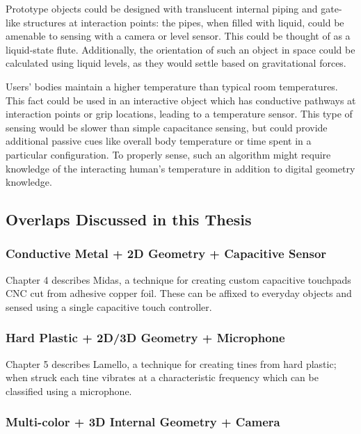     Prototype objects could be designed with translucent internal piping and gate-like structures at interaction points: the pipes, when filled with liquid, could be amenable to sensing with a camera or level sensor. This could be thought of as a liquid-state flute. Additionally, the orientation of such an object in space could be calculated using liquid levels, as they would settle based on gravitational forces.
    
    Users' bodies maintain a higher temperature than typical room temperatures. This fact could be used in an interactive object which has conductive pathways at interaction points or grip locations, leading to a temperature sensor. This type of sensing would be slower than simple capacitance sensing, but could provide additional passive cues like overall body temperature or time spent in a particular configuration. To properly sense, such an algorithm might require knowledge of the interacting human's temperature in addition to digital geometry knowledge.
    
\subsection{Overlaps Discussed in this Thesis}

    \subsubsection{Conductive Metal + 2D Geometry + Capacitive Sensor}
    
    Chapter 4 describes Midas, a technique for creating custom capacitive touchpads CNC cut from adhesive copper foil. These can be affixed to everyday objects and sensed using a single capacitive touch controller.
    
    \subsubsection{Hard Plastic + 2D/3D Geometry + Microphone}
    
    Chapter 5 describes Lamello, a technique for creating tines from hard plastic; when struck each tine vibrates at a characteristic frequency which can be classified using a microphone.
    
    \subsubsection{Multi-color + 3D Internal Geometry + Camera}
    
